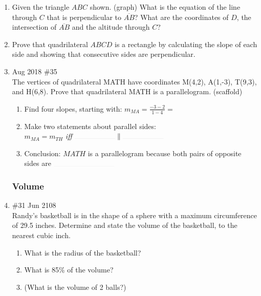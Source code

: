 \documentclass[12pt, twoside]{article}
\begin{document}
\begin{enumerate}
    \item Given the triangle $ABC$ shown. (graph) What is the equation of the line through $C$ that is perpendicular to $\overline{AB}$? What are the coordinates of $D$, the intersection of $\overline{AB}$ and the altitude through $C$?

    \item Prove that quadrilateral $ABCD$ is a rectangle by calculating the slope of each side and showing that consecutive sides are perpendicular.

    \item Aug 2018 \#35\\
    The vertices of quadrilateral MATH have coordinates M(4,2), A(1,-3), T(9,3), and H(6,8). Prove that quadrilateral MATH is a parallelogram.
    (scaffold)
      \begin{enumerate}
        \item Find four slopes, starting with: $\displaystyle m_{MA}=\frac{-3-2}{1-4}=$
        \item Make two statements about parallel sides:\\
        $ m_{MA} = m_{TH}$ \emph{iff} $\rule{2cm}{0.015mm} \parallel \rule{2cm}{0.015mm}$ %
        \item Conclusion: $MATH$ is a parallelogram because both pairs of opposite sides are $\rule{3cm}{0.015mm}$
    \end{enumerate}

    \subsubsection*{Volume}

    \item \#31 Jun 2108\\
    Randy’s basketball is in the shape of a sphere with a maximum circumference of 29.5 inches. Determine and state the volume of the basketball, to the nearest cubic inch.
      \begin{enumerate}
        \item What is the radius of the basketball? \vspace{2cm}
        \item What is 85\% of the volume? \vspace{2cm}
        \item (What is the volume of 2 balls?) \vspace{2cm}
      \end{enumerate}


\end{enumerate}
\end{document}
